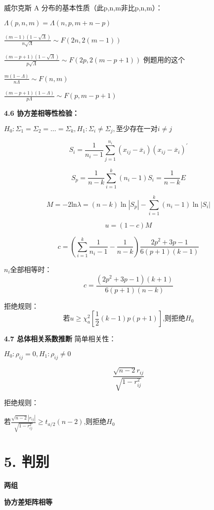 \documentclass[10pt,a4paper]{ctexart} %
\begin{document}
\begin{multicols*}{3}
		威尔克斯 A 分布的基本性质（此p,n,m非比p,n,m）：
		
		$\Lambda(p,n,m)=\Lambda(n,p,m+n-p)$
		
		$\frac{\left(m-1\right)\left(1-\sqrt{\Lambda}\right)}{n\sqrt{\Lambda}}\sim F\left(2n,2\left(m-1\right)\right)$
		
		$\frac{\left(m-p+1\right)\left(1-\sqrt{\Lambda}\right)}{p\sqrt{\Lambda}}\sim F\left(2p,2\left(m-p+1\right)\right)$ 例题用的这个
		
		$\frac{m(1-\Lambda)}{n\Lambda}\sim F(n,m)$
		
		$\frac{(m-p+1)(1-\Lambda)}{p\Lambda}\sim F(p,m-p+1)$
		
		
		\textbf{4.6 协方差相等性检验：}
		
		$H_0:\Sigma_1=\Sigma_2=\dots=\Sigma_k,H_1:\Sigma_i \neq \Sigma_j, \text{至少存在一对}i \neq j$
		
		$$S_i=\frac{1}{n_i-1}\sum_{j=1}^{n_i}\left(x_{ij}-\overline{x}_i\right)\left(x_{ij}-\overline{x}_i\right)^{\prime}$$
		
		$$S_p=\frac{1}{n-k}\sum_{i=1}^k\left(n_i-1\right)S_i=\frac{1}{n-k}E$$
		
		$$M=-2\mathrm{ln}\lambda=(n-k)\ln|S_{p}|-\sum_{i=1}^{k}(n_{i}-1)\ln|S_{i}|$$
		
		$$u=(1-c)M$$
		
		$$c=\left(\sum_{i=1}^{k}\frac{1}{n_{i}-1}-\frac{1}{n-k}\right)\frac{2p^{2}+3p-1}{6(p+1)(k-1)}$$
		
		$n_i$全部相等时：
		$$c=\frac{\left(2p^{2}+3p-1\right)\left(k+1\right)}{6\left(p+1\right)\left(n-k\right)}$$
		
		拒绝规则：
		$$\text{若}u\geqslant\chi_{a}^{2}\left[\frac{1}{2}\left(k-1\right)p\left(p+1\right)\right]\text{,则拒绝}H_{0}$$
		
		\textbf{4.7 总体相关系数推断}
		简单相关性：
		
		$H_0:\rho_{ij}=0,H_1:\rho_{ij} \neq 0$
		
		$$\frac{\sqrt{n-2}r_{ij}}{\sqrt{1-r_{ij}^2}}$$
		
		拒绝规则：
		
		$\text{若}\frac{\sqrt{n-2}\left|r_{ij}\right|}{\sqrt{1-r_{ij}^{2}}}\geqslant t_{a/2}\left(n-2\right)\text{,则拒绝}H_{0}$
		
		\section*{\centering \normalsize 5. 判别}
		\textbf{两组}
		
		\textbf{协方差矩阵相等}
		

\end{multicols*}
\end{document}

